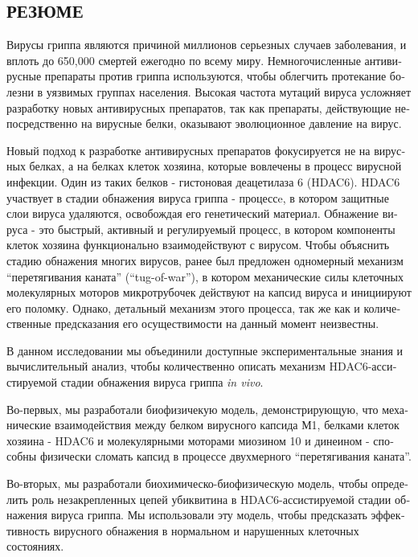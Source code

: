 \begin{otherlanguage}{russian}
\chapter*{РЕЗЮМЕ}


Вирусы гриппа являются причиной миллионов серьезных случаев заболевания, и вплоть до 650,000 смертей ежегодно по всему миру. Немногочисленные антивирусные препараты против гриппа используются, чтобы облегчить протекание болезни в уязвимых группах населения. Высокая частота мутаций вируса усложняет разработку новых антивирусных препаратов, так как препараты, действующие непосредственно на вирусные белки, оказывают эволюционное давление на вирус.

Новый подход к разработке антивирусных препаратов фокусируется не на вирусных белках, а на белках клеток хозяина, которые вовлечены в процесс вирусной инфекции. Один из таких белков - гистоновая деацетилаза 6 (HDAC6). HDAC6 участвует в стадии обнажения вируса гриппа - процессe, в котором защитные слои вируса удаляются, освобождая его генетический материал. Обнажение вируса - это быстрый, активный и регулируемый процесс, в котором компоненты клеток хозяина функционально взаимодействуют с вирусом. Чтобы объяснить стадию обнажения многих вирусов, ранее был предложен одномерный механизм “перетягивания каната” (“tug-of-war”), в котором механические силы клеточных молекулярных моторов микротрубочек действуют на капсид вируса и инициируют его поломку. Однако, детальный механизм этого процесса, так же как и количественные предсказания его осуществимости на данный момент неизвестны.

В данном исследовании мы объединили доступные экспериментальные знания и вычислительный анализ, чтобы количественно описать механизм HDAC6-ассистируемой стадии обнажения вируса гриппа \textit{in vivo}.

Во-первых, мы разработали биофизичекую модель, демонстрирующую, что механические взаимодействия между белком вирусного капсида М1, белками клеток хозяина - HDAC6 и молекулярными моторами миозином 10 и динеином - способны физически сломать капсид в процессе двухмерного “перетягивания каната”.

Во-вторых, мы разработали биохимическо-биофизическую модель, чтобы определить роль незакрепленных цепей убиквитина в HDAC6-ассистируемой стадии обнажения вируса гриппа. Мы использовали эту модель, чтобы предсказать эффективность вирусного обнажения в нормальном и нарушенных клеточных состояниях.


\end{otherlanguage}
